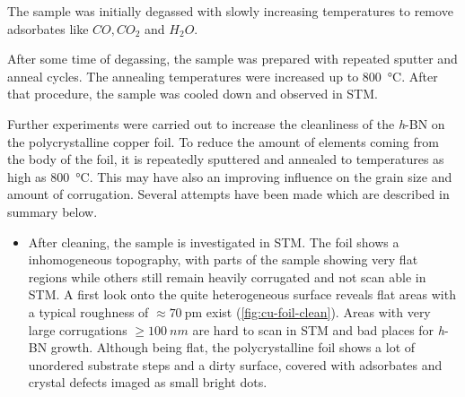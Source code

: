 		The sample was initially degassed with slowly increasing temperatures to remove adsorbates like $CO, CO_2$ and $H_2O$.
		
		After some time of degassing, the sample was prepared with repeated sputter and anneal cycles. The annealing temperatures were increased up to \SI{800}{\degreeCelsius}. 
		After that procedure, the sample was cooled down and observed in STM.
		
		Further experiments were carried out to increase the cleanliness of the \textit{h}-BN on the polycrystalline copper foil. To reduce the amount of elements coming from the body of the foil, it is repeatedly sputtered and annealed to temperatures as high as \SI{800}{\celsius}. This may have also an improving influence on the grain size and amount of corrugation. Several attempts have been made which are described in summary below.
\begin{itemize}
	\item After cleaning, the sample is investigated in STM. The foil shows a inhomogeneous topography, with parts of the sample showing very flat regions while others still remain heavily corrugated and not scan able in STM. 
	A first look onto the quite heterogeneous surface reveals flat areas with a typical roughness of $\approx \SI{70}{\pico\meter}$ exist (\autoref{fig:cu-foil-clean}). Areas with very large corrugations $\geq \SI{100}{nm}$ are hard to scan in STM and bad places for \textit{h}-BN growth. Although being flat, the polycrystalline foil shows a lot of unordered substrate steps and a dirty surface, covered with adsorbates and crystal defects imaged as small bright dots.
\end{itemize}


